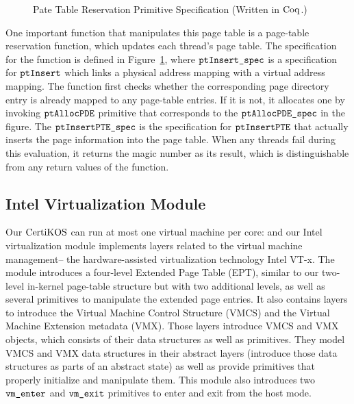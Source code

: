  \begin{figure}
 
\caption{Pate Table Reservation Primitive Specification (Written in $\mathrm{Coq}$.)}
\label{fig:chapter:certikos:ptresv-func}
\end{figure}
 One important function that manipulates this page table is a page-table reservation function,
 which updates each thread's page table.
 The specification for the function is defined in Figure~\ref{fig:chapter:certikos:ptresv-func},
  where  ${\mathrm{\texttt{ptInsert\_spec}}}$ is a specification for  ${\mathrm{\texttt{ptInsert}}}$  which links 
a physical address mapping with a virtual address mapping. 
The function first checks whether the corresponding page directory entry is already mapped to any page-table entries.
If it is not, it allocates one by invoking ${\mathrm{\texttt{ptAllocPDE}}}$ primitive that corresponds to the  ${\mathrm{\texttt{ptAllocPDE\_spec}}}$
in the figure.
The ${\mathrm{\texttt{ptInsertPTE\_spec}}}$ is the specification for  ${\mathrm{\texttt{ptInsertPTE}}}$ that actually inserts the page 
information into the page table. 
When any threads fail during this evaluation, it returns the magic number as its result, which is distinguishable from 
any return values of the function.

\subsection{Intel Virtualization Module}
\label{chapter:certikos:subsec:virtualization-module}

Our $\mathrm{CertiKOS}$ can run at most one virtual machine per  core:
and our Intel virtualization module implements layers related to the virtual machine management--
the hardware-assisted virtualization technology Intel VT-x.  
The module introduces a four-level Extended Page Table (EPT), 
similar to our two-level in-kernel page-table structure but  with two additional levels, 
as well as several primitives to manipulate the extended page entries.
It also contains layers to introduce the Virtual Machine Control Structure (VMCS) and the
 Virtual Machine Extension metadata (VMX).
Those layers introduce VMCS and VMX objects, which consists of their data structures as well as primitives. 
They model VMCS and VMX data structures  in their 
 abstract layers (introduce those data structures as parts of an abstract state)
as well as provide primitives that properly initialize and manipulate them. 
This module also introduces two ${\mathrm{\texttt{vm\_enter}}}$ and ${\mathrm{\texttt{vm\_exit}}}$ primitives to enter and exit from the host mode.

